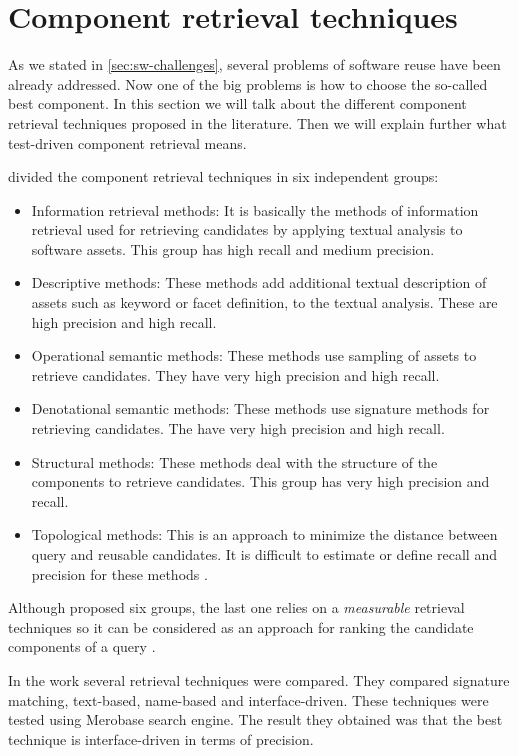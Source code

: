 \section{Component retrieval techniques}
As we stated in \ref{sec:sw-challenges}, several problems of software reuse have been already addressed. Now one of the big problems is how to choose the so-called best component. In this section we will talk about the different component retrieval techniques proposed in the literature. Then we will explain further what test-driven component retrieval means.

\cite{Mili1998} divided the component retrieval techniques in six independent groups:

\begin{itemize}
\item Information retrieval methods: It is basically the methods of information retrieval used for retrieving candidates by applying textual analysis to software assets. This group has high recall and medium precision.
\item Descriptive methods: These methods add additional textual description of assets such as keyword or facet definition, to the textual analysis. These are high precision and high recall.
\item Operational semantic methods: These methods use sampling of assets to retrieve candidates. They have very high precision and high recall.
\item Denotational semantic methods: These methods use signature methods for retrieving candidates. The have very high precision and high recall.
\item Structural methods: These methods deal with the structure of the components to retrieve candidates. This group has very high precision and recall.
\item Topological methods: This is an approach to minimize the distance between query and reusable candidates. It is difficult to estimate or define recall and precision for these methods \citep{Mili1998}.
\end{itemize}

Although \cite{Mili1998} proposed six groups, the last one relies on a \textit{measurable} retrieval techniques so it can be considered as an approach for ranking the candidate components of a query \citep{Hummel2007}.

In the work \cite{Hummel2007} several retrieval techniques were compared. They compared signature matching, text-based, name-based and interface-driven. These techniques were tested using Merobase search engine. The result they obtained was that the best technique is interface-driven in terms of precision.

